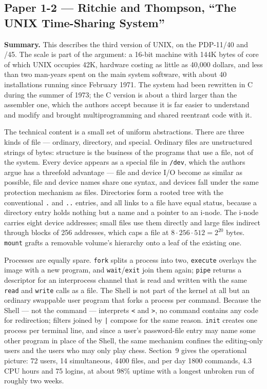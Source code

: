 \subsection*{Paper 1-2 --- Ritchie and Thompson, ``The UNIX Time-Sharing System''}
\label{p3:sec:unix}

\textbf{Summary.}
This describes the third version of UNIX, on the PDP-11/40 and /45. The scale is part of the
argument: a 16-bit machine with 144K bytes of core of which UNIX occupies 42K, hardware
costing as little as 40{,}000 dollars, and less than two man-years spent on the main system
software, with about 40 installations running since February 1971. The system had been
rewritten in C during the summer of 1973; the C version is about a third larger than the
assembler one, which the authors accept because it is far easier to understand and modify
and brought multiprogramming and shared reentrant code with it.

The technical content is a small set of uniform abstractions. There are three kinds of file
--- ordinary, directory, and special. Ordinary files are unstructured strings of bytes:
structure is the business of the programs that use a file, not of the system. Every device
appears as a special file in \texttt{/dev}, which the authors argue has a threefold
advantage --- file and device I/O become as similar as possible, file and device names share
one syntax, and devices fall under the same protection mechanism as files. Directories form
a rooted tree with the conventional \texttt{.} and \texttt{..} entries, and all links to a
file have equal status, because a directory entry holds nothing but a name and a pointer to
an i-node. The i-node carries eight device addresses; small files use them directly and
large files indirect through blocks of 256 addresses, which caps a file at
$8 \cdot 256 \cdot 512 = 2^{20}$ bytes. \texttt{mount} grafts a removable volume's hierarchy
onto a leaf of the existing one.

Processes are equally spare. \texttt{fork} splits a process into two, \texttt{execute}
overlays the image with a new program, and \texttt{wait}/\texttt{exit} join them again;
\texttt{pipe} returns a descriptor for an interprocess channel that is read and written with
the same \texttt{read} and \texttt{write} calls as a file. The Shell is not part of the
kernel at all but an ordinary swappable user program that forks a process per command.
Because the Shell --- not the command --- interprets \texttt{<} and \texttt{>}, no command
contains any code for redirection; filters joined by \texttt{|} compose for the same reason.
\texttt{init} creates one process per terminal line, and since a user's password-file entry
may name some other program in place of the Shell, the same mechanism confines the
editing-only users and the users who may only play chess. Section~9 gives the operational
picture: 72 users, 14 simultaneous, 4400 files, and per day 1800 commands, 4.3 CPU hours and
75 logins, at about 98\% uptime with a longest unbroken run of roughly two weeks.

